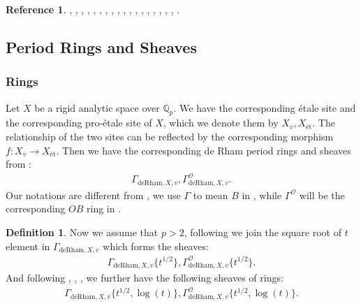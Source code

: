 \documentclass[12pt]{book}
\theoremstyle{definition}
\newtheorem{definition}{Definition}
\newtheorem{reference}{Reference}
\begin{document}
\begin{reference}
\cite{Sch1}, \cite{Sch2}, \cite{FS}, \cite{KL1}, \cite{KL2}, \cite{BL1}, \cite{BL2}, \cite{BS}, \cite{BHS}, \cite{Fon1}, \cite{CS1}, \cite{CS2}, \cite{BK}, \cite{BBK}, \cite{BBBK}, \cite{KKM}, \cite{KM}, \cite{LZ}, \cite{M}.
\end{reference}

\subsection{Period Rings and Sheaves}

\subsubsection{Rings}

\noindent Let $X$ be a rigid analytic space over $\mathbb{Q}_p$. We have the corresponding \'etale site and the corresponding pro-\'etale site of $X$, which we denote them by $X_{v},X_\text{\'et}$. The relationship of the two sites can be reflected by the corresponding morphism $f:X_{v}\longrightarrow X_\text{\'et}$. Then we have the corresponding de Rham period rings and sheaves from \cite{Sch1}:
\begin{align}
\Gamma_{\text{deRham},X,v}, \Gamma^\mathcal{O}_{\text{deRham},X,v}.
\end{align}
Our notations are different from \cite{Sch1}, we use $\Gamma$ to mean $B$ in \cite{Sch1}, while $\Gamma^\mathcal{O}$ will be the corresponding $OB$ ring in \cite{Sch1}.\\

\begin{definition}
\indent Now we assume that $p>2$, following \cite{BS} we join the square root of $t$ element in $\Gamma_{\text{deRham},X,v}$ which forms the sheaves:
\begin{align}
\Gamma_{\text{deRham},X,v}\{t^{1/2}\},\Gamma^\mathcal{O}_{\text{deRham},X,v}\{t^{1/2}\}.
\end{align}
And following \cite{BL1}, \cite{BL2}, \cite{Fon1}, \cite{BHS} we further have the following sheaves of rings:
\begin{align}
\Gamma_{\text{deRham},X,v}\{t^{1/2},\log(t)\},\Gamma^\mathcal{O}_{\text{deRham},X,v}\{t^{1/2},\log(t)\}.
\end{align}
\end{definition}
\end{document}
